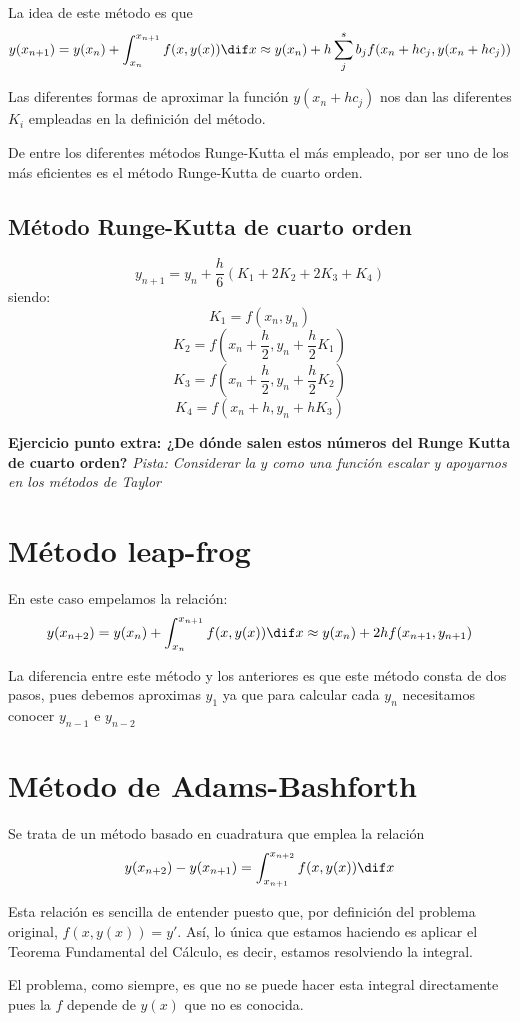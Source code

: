 La idea de este método es que
\[y(x_{n+1}) = y(x_n) + \int_{x_n}^{x_{n+1}} f(x,y(x))\dif x \approx y(x_n)+h \sum_{j}^{s} b_j f(x_n+hc_j, y(x_n+hc_j))\]

Las diferentes formas de aproximar la función $y(x_n+hc_j)$ nos dan las diferentes $K_i$ empleadas en la definición del método.

De entre los diferentes métodos Runge-Kutta el más empleado, por ser uno de los más eficientes es el método Runge-Kutta de cuarto orden.

\subsection{Método Runge-Kutta de cuarto orden}
\[y_{n+1} = y_n +\frac{h}{6}(K_1+2K_2+2K_3+K_4)\]
siendo:
\[K_1 = f(x_n,y_n)\]
\[K_2 = f(x_n+\frac{h}{2}, y_n+\frac{h}{2}K_1)\]
\[K_3 = f(x_n+\frac{h}{2}, y_n + \frac{h}{2}K_2)\]
\[K_4 = f(x_n+h, y_n + h K_3)\]

\textbf{Ejercicio punto extra: ¿De dónde salen estos números del Runge Kutta de cuarto orden?}
\textit{Pista: Considerar la $y$ como una función escalar y apoyarnos en los métodos de Taylor}

\section{Método leap-frog}
En este caso empelamos la relación:
\[y(x_{n+2}) = y(x_n) + \int_{x_n}^{x_{n+1}} f(x,y(x)) \dif x \approx y(x_n) + 2h f(x_{n+1},y_{n+1})\]

La diferencia entre este método y los anteriores es que este método consta de dos pasos, pues debemos aproximas $y_1$ ya que para calcular cada $y_n$ necesitamos conocer $y_{n-1}$ e $y_{n-2}$

\section{Método de Adams-Bashforth}

Se trata de un método basado en cuadratura que emplea la relación
\[y(x_{n+2}) - y(x_{n+1}) = \int_{x_{n+1}}^{x_{n+2}} f(x,y(x)) \dif x\]

\begin{remark}
Esta relación es sencilla de entender puesto que, por definición del problema original, $f(x,y(x))=y'$. Así, lo única que estamos haciendo es aplicar el Teorema Fundamental del Cálculo, es decir, estamos resolviendo la integral.

El problema, como siempre, es que no se puede hacer esta integral directamente pues la $f$ depende de $y(x)$ que no es conocida.
\end{remark}

